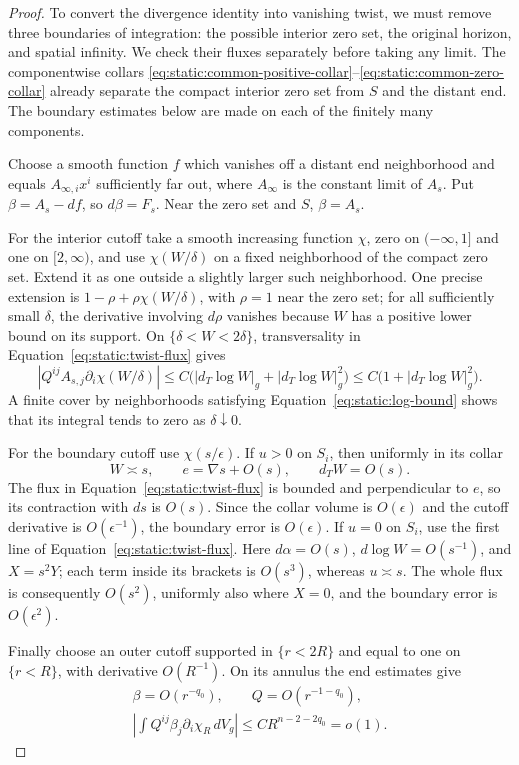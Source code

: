 \begin{proof}
To convert the divergence identity into vanishing twist, we must
remove three boundaries of integration: the possible interior zero
set, the original horizon, and spatial infinity.  We check their fluxes
separately before taking any limit.  The componentwise collars
\eqref{eq:static:common-positive-collar}--\eqref{eq:static:common-zero-collar}
already separate the compact interior zero set from $S$ and the
distant end.  The boundary estimates below are made on each of
the finitely many components.

Choose a smooth function $f$ which vanishes off a distant end
neighborhood and equals $A_{\infty,i}x^i$ sufficiently far out,
where $A_\infty$ is the constant limit of $A_s$. Put
$\beta=A_s-df$, so $d\beta=F_s$. Near the zero set and $S$,
$\beta=A_s$.

For the interior cutoff take a smooth increasing function
$\chi$, zero on $(-\infty,1]$ and one on $[2,\infty)$, and use
$\chi(W/\delta)$ on a fixed neighborhood of the compact zero set.
Extend it as one outside a slightly larger such neighborhood.
One precise extension is $1-\rho+\rho\chi(W/\delta)$, with
$\rho=1$ near the zero set; for all sufficiently small $\delta$,
the derivative involving $d\rho$ vanishes because $W$ has a
positive lower bound on its support. On
$\{\delta<W<2\delta\}$, transversality in
Equation~\eqref{eq:static:twist-flux} gives
\[
 \left|Q^{ij}A_{s,j}\partial_i\chi(W/\delta)\right|
 \leq C\bigl(|d_T\log W|_g+|d_T\log W|_g^2\bigr)
 \leq C\bigl(1+|d_T\log W|_g^2\bigr).
\]
A finite cover by neighborhoods satisfying
Equation~\eqref{eq:static:log-bound} shows that its integral tends
to zero as $\delta\downarrow0$.

For the boundary cutoff use $\chi(s/\epsilon)$. If $u>0$ on
$S_i$, then uniformly in its collar
\[
 W\asymp s,\qquad e=\nabla s+O(s),\qquad d_TW=O(s).
\]
The flux in Equation~\eqref{eq:static:twist-flux} is bounded and
perpendicular to $e$, so its contraction with $ds$ is $O(s)$.
Since the collar volume is $O(\epsilon)$ and the cutoff derivative
is $O(\epsilon^{-1})$, the boundary error is $O(\epsilon)$.
If $u=0$ on $S_i$, use the first line of
Equation~\eqref{eq:static:twist-flux}. Here
$d\alpha=O(s)$, $d\log W=O(s^{-1})$, and $X=s^2Y$; each term
inside its brackets is $O(s^3)$, whereas $u\asymp s$.
The whole flux is consequently $O(s^2)$, uniformly also where
$X=0$, and the boundary error is $O(\epsilon^2)$.

Finally choose an outer cutoff supported in $\{r<2R\}$ and equal
to one on $\{r<R\}$, with derivative $O(R^{-1})$. On its annulus
the end estimates give
\[
 \begin{gathered}
 \beta=O(r^{-q_0}),\qquad
 Q=O(r^{-1-q_0}),\\
 \left|\int Q^{ij}\beta_j\partial_i\chi_R\,dV_g\right|
 \leq CR^{n-2-2q_0}=o(1).
 \end{gathered}
\]


\end{proof}
